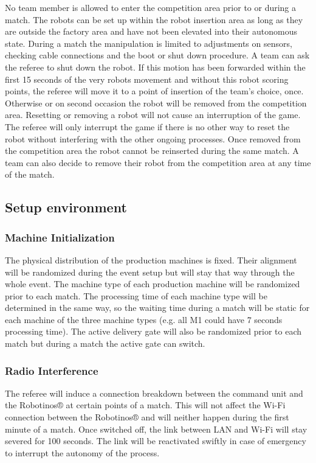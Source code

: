 \documentclass[12pt,twoside]{article}
\begin{document}
No team member is allowed to enter the competition area prior to or
during a match. The robots can be set up within the robot insertion
area as long as they are outside the factory area and have not been
elevated into their autonomous state. During a match the manipulation
is limited to adjustments on sensors, checking cable connections and
the boot or shut down procedure. A team can ask the referee to shut
down the robot. If this motion has been forwarded within the first 15
seconds of the very robots movement and without this robot scoring
points, the referee will move it to a point of insertion of the team’s
choice, once. Otherwise or on second occasion the robot will be
removed from the competition area. Resetting or removing a robot will
not cause an interruption of the game. The referee will only interrupt
the game if there is no other way to reset the robot without
interfering with the other ongoing processes. Once removed from the
competition area the robot cannot be reinserted during the same match.
A team can also decide to remove their robot from the competition area
at any time of the match.

\subsection{Setup environment}
\subsubsection{Machine Initialization}

The physical distribution of the production machines is fixed. Their
alignment will be randomized during the event setup but will stay that
way through the whole event. The machine type of each production
machine will be randomized prior to each match. The processing time of
each machine type will be determined in the same way, so the waiting
time during a match will be static for each machine of the three
machine types (e.g. all M1 could have 7 seconds processing time). The
active delivery gate will also be randomized prior to each match but
during a match the active gate can switch.


\subsubsection{Radio Interference}

The referee will induce a connection breakdown between the command
unit and the Robotinos® at certain points of a match. This will not
affect the Wi-Fi connection between the Robotinos® and will neither
happen during the first minute of a match. Once switched off, the link
between LAN and Wi-Fi will stay severed for 100 seconds. The link will
be reactivated swiftly in case of emergency to interrupt the autonomy
of the process.
\end{document}
